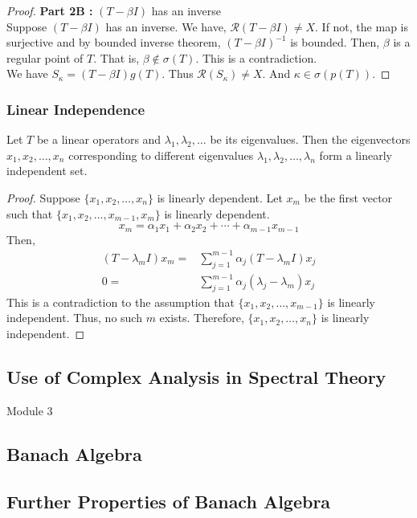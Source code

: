 \begin{proof}
	\textbf{Part 2B :} $(T-\beta I)$ has an inverse\\
	Suppose $(T-\beta I)$ has an inverse.
	We have, $\mathscr{R}(T-\beta I) \ne X$.
	If not, the map is surjective and by bounded inverse theorem, $(T-\beta I)^{-1}$ is bounded.
	Then, $\beta$ is a regular point of $T$.
	That is, $\beta \notin \sigma(T)$.
	This is a contradiction.\\

	We have $S_\kappa = (T-\beta I)g(T)$.
	Thus $\mathscr{R}(S_\kappa) \ne X$.
	And $\kappa \in \sigma(p(T))$.
\end{proof}
\subsubsection{Linear Independence}
\begin{theorem}
	Let $T$ be a linear operators and $\lambda_1,\lambda_2,\dotsc$ be its eigenvalues.
	Then the eigenvectors $x_1,x_2,\dots,x_n$ corresponding to different eigenvalues $\lambda_1,\lambda_2,\dots,\lambda_n$ form a linearly independent set.
\end{theorem}
\begin{proof}
	Suppose $\{x_1,x_2,\dots,x_n\}$ is linearly dependent.
	Let $x_m$ be the first vector such that $\{ x_1,x_2,\dots,x_{m-1},x_m\}$ is linearly dependent.
	\[ x_m = \alpha_1 x_1 + \alpha_2 x_2 + \dotsb + \alpha_{m-1}x_{m-1} \]
	Then,
	\begin{align*}
		(T-\lambda_m I)x_m 
		= & \sum_{j=1}^{m-1} \alpha_j (T-\lambda_m I)x_j \\
		0 = & \sum_{j=1}^{m-1} \alpha_j (\lambda_j-\lambda_m)x_j
	\end{align*}
	This is a contradiction to the assumption that $\{ x_1,x_2,\dots,x_{m-1} \}$ is linearly independent.
	Thus, no such $m$ exists.
	Therefore, $\{x_1,x_2,\dots,x_n\}$ is linearly independent.
\end{proof}
\pagebreak

\subsection{Use of Complex Analysis in Spectral Theory}

{\Large Module 3}
\subsection{Banach Algebra}
\subsection{Further Properties of Banach Algebra}

